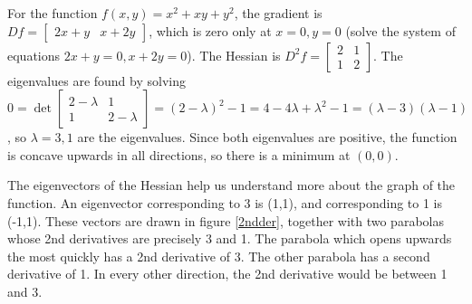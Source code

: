 \begin{example}
For the function {$f(x,y)=x^2+xy+y^2$}, the gradient is $Df = \begin{bmatrix}2x+y&x+2y \end{bmatrix}$, which is zero only at $x=0,y=0$ (solve the system of equations $2x+y=0,x+2y=0$). The Hessian is $D^2f = \begin{bmatrix}2&1 \\1&2\end{bmatrix}$. The eigenvalues are found by solving $0=\det \begin{bmatrix}2-\lambda &1 \\1&2-\lambda \end{bmatrix} = (2-\lambda)^2-1 = 4-4\lambda+\lambda^2 -1 = (\lambda-3)(\lambda-1)$, so $\lambda = 3,1$ are the eigenvalues.  Since both eigenvalues are positive, the function is concave upwards in all directions, so there is a minimum at $(0,0)$.  

The eigenvectors of the Hessian help us understand more about the graph of the function.  An eigenvector corresponding to 3 is (1,1), and corresponding to 1 is (-1,1). These vectors are drawn in figure \ref{2ndder}, together with two parabolas whose 2nd derivatives are precisely 3 and 1.  The parabola which opens upwards the most quickly has a 2nd derivative of 3.  The other parabola has a second derivative of 1. In every other direction, the 2nd derivative would be between 1 and 3.

\end{example}


